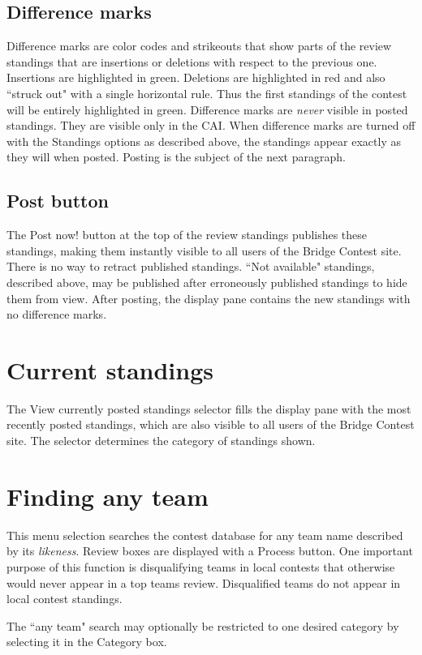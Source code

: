 \documentclass[11pt,letterpaper]{refart}
\def\ui#1{\textsf{#1}}
\begin{document}
\subsection{Difference marks}
Difference marks are color codes and strikeouts that show parts of the review standings
that are insertions or deletions with respect to the previous one.  Insertions are highlighted in green.
Deletions are highlighted in red and also ``struck out" with a single horizontal rule. Thus 
the first standings of the contest will be entirely highlighted in green.  Difference marks are
\emph{never} visible in posted standings.  They are visible only in the CAI.  When difference
marks are turned off with the \ui{Standings options} as described above, the standings appear
exactly as they will when posted.  Posting is the subject of the next paragraph.

\subsection{Post button}
The \ui{Post now!} button at the top of the review standings publishes these standings, making them
instantly visible to all users of the Bridge Contest site. There is no way to retract published standings.
``Not available" standings, described above, may be published after erroneously published standings
to hide them from view. After posting, the display pane contains the new standings with no difference
marks.

\section{Current standings}
The \ui{View currently posted standings} selector fills the display pane with the
most recently posted standings, which are also visible to all users of the Bridge Contest site.  The
selector determines the category of standings shown.

\section{Finding any team}
This menu selection searches the contest database for any team name described 
by its \emph{likeness}.  Review boxes are displayed with a \ui{Process} button.  One
important purpose of this function is disqualifying teams in local contests that otherwise 
would never appear in a top teams review.  Disqualified teams do not appear in local
contest standings.  

The ``any team" search may optionally be restricted to one desired category by selecting
it in the \ui{Category} box.
\end{document}
